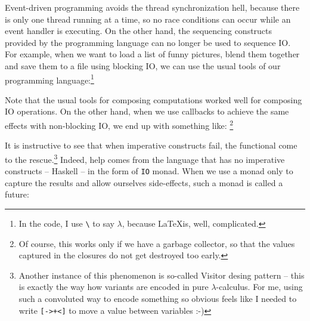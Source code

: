 Event-driven programming avoids the thread synchronization hell, because there
is only one thread running at a time, so no race conditions can occur while an
event handler is executing. On the other hand, the sequencing constructs
provided by the programming language can no longer be used to sequence IO. For
example, when we want to load a list of funny pictures, blend them together and
save them to a file using blocking IO, we can use the usual tools of our
programming language:\footnote{In the code, I use \texttt{\textbackslash} to say
$\lambda$, because \LaTeX is, well, complicated.}


Note that the usual tools for composing computations worked well for composing
IO operations. On the other hand, when we use callbacks to achieve the same
effects with non-blocking IO, we end up with something like: \footnote{Of
course, this works only if we have a garbage collector, so that the values
captured in the closures do not get destroyed too early.}


It is instructive to see that when imperative constructs fail, the functional
come to the rescue.\footnote{Another instance of this phenomenon is so-called
Visitor desing pattern -- this is exactly the way how variants are encoded in
pure $\lambda$-calculus. For me, using such a convoluted way to encode something
so obvious feels like I needed to write \texttt{[->+<]} to move a value between
variables :-)} Indeed, help comes from the language that has no imperative
constructs -- Haskell -- in the form of \texttt{IO} monad. When we use a monad
only to capture the results and allow ourselves side-effects, such a monad is
called a future: 

